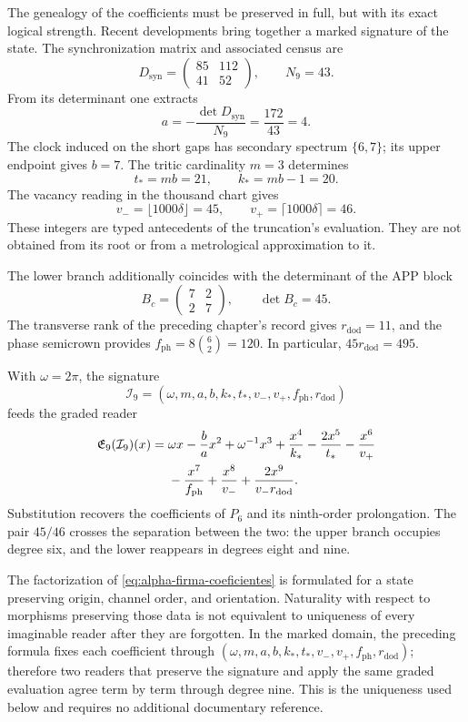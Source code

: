 The genealogy of the coefficients must be preserved in full, but with its
exact logical strength. Recent developments bring together a marked signature
of the state. The synchronization matrix and associated census are
\[
 D_{\mathrm{syn}}=\begin{pmatrix}85&112\\41&52\end{pmatrix},
 \qquad N_9=43.
\]
From its determinant one extracts
\[
 a=-\frac{\det D_{\mathrm{syn}}}{N_9}
   =\frac{172}{43}=4.
\]
The clock induced on the short gaps has secondary spectrum
\(\{6,7\}\); its upper endpoint gives \(b=7\). The tritic cardinality
\(m=3\) determines
\[
 t_*=mb=21,\qquad k_*=mb-1=20.
\]
The vacancy reading in the thousand chart gives
\[
 v_-=\lfloor1000\delta\rfloor=45,\qquad
 v_+=\lceil1000\delta\rceil=46.
\]
These integers are typed antecedents of the truncation's evaluation. They are not
obtained from its root or from a metrological approximation to it.

The lower branch additionally coincides with the determinant of the APP block
\[
 B_c=\begin{pmatrix}7&2\\2&7\end{pmatrix},\qquad\det B_c=45.
\]
The transverse rank of the preceding chapter's record gives
\(r_{\mathrm{dod}}=11\), and the phase semicrown provides
\(f_{\mathrm{ph}}=8\binom62=120\). In particular,
\(45r_{\mathrm{dod}}=495\).

With \(\omega=2\pi\), the signature
\[
 \mathcal I_9=(\omega,m,a,b,k_*,t_*,v_-,v_+,f_{\mathrm{ph}},r_{\mathrm{dod}})
\]
feeds the graded reader
\begin{align}
 \mathfrak E_9(\mathcal I_9)(x)
 ={}&\omega x-\frac ba x^2+\omega^{-1}x^3
 +\frac{x^4}{k_*}-\frac{2x^5}{t_*}-\frac{x^6}{v_+}\notag\\
 &-\frac{x^7}{f_{\mathrm{ph}}}+\frac{x^8}{v_-}
 +\frac{2x^9}{v_-r_{\mathrm{dod}}}.
 \label{eq:alpha-firma-coeficientes}
\end{align}
Substitution recovers the coefficients of \(P_6\) and its
ninth-order prolongation. The pair \(45/46\) crosses the separation
between the two: the upper branch occupies degree six, and the lower reappears
in degrees eight and nine.

The factorization of \eqref{eq:alpha-firma-coeficientes} is formulated
for a state preserving origin, channel order, and orientation.
Naturality with respect to morphisms preserving those data is not equivalent to
uniqueness of every imaginable reader after they are forgotten. In the marked
domain, the preceding formula fixes each coefficient through
\((\omega,m,a,b,k_*,t_*,v_-,v_+,f_{\mathrm{ph}},r_{\mathrm{dod}})\);
therefore two readers that preserve the signature and apply the same
graded evaluation agree term by term through degree nine. This
is the uniqueness used below and requires no additional
documentary reference.

